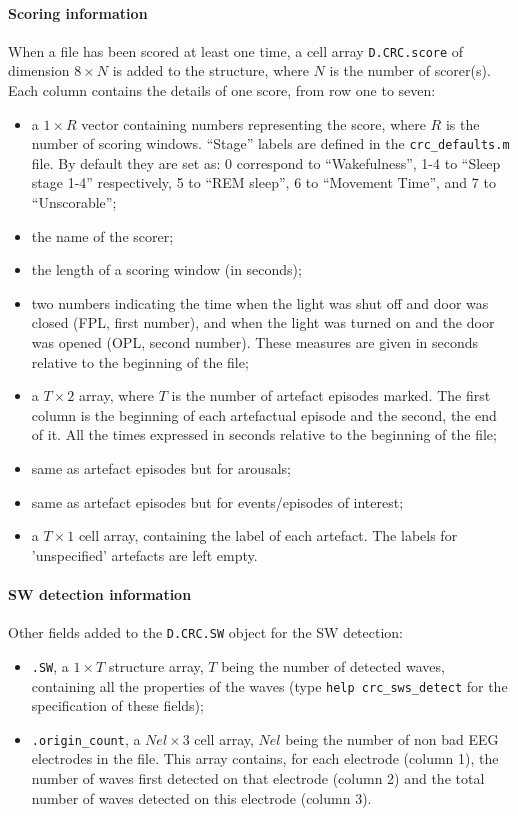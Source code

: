 \documentclass[a4paper,titlepage]{article}
\newcommand{\bi}{\begin{itemize}}
\newcommand{\ei}{\end{itemize}}
\begin{document}
\paragraph{Scoring information}
When a file has been scored at least one time, a cell array {\tt D.CRC.score} of dimension $8\times N$ is added to the structure, where $N$ is the number of scorer(s). Each column contains the details of one score, from row one to seven:
\bi
\item a $1\times R$ vector containing numbers representing the score, where $R$ is the number of scoring windows. ``Stage'' labels  are defined in the {\tt crc\_defaults.m} file. By default they are set as: 0 correspond to ``Wakefulness'', 1-4 to ``Sleep stage 1-4'' respectively, 5 to ``REM sleep'', 6 to ``Movement Time'', and 7 to ``Unscorable'';
\item the name of the scorer;
\item the length of a scoring window (in seconds);
\item two numbers indicating the time when the light was shut off and door was closed (FPL, first number), and when the light was turned on and the door was opened (OPL, second number). These measures are given in seconds relative to the beginning of the file;
\item a $T\times 2$ array, where $T$ is the number of artefact episodes marked. The first column is the beginning of each artefactual episode and the second, the end of it. All the times expressed in seconds relative to the beginning of the file;
\item same as artefact episodes but for arousals;
\item same as artefact episodes but for events/episodes of interest;
\item a $T\times 1$ cell array, containing the label of each artefact. The labels for 'unspecified' artefacts are left empty.
\ei

\paragraph{SW detection information}
Other fields added to the {\tt D.CRC.SW} object for the SW detection:
\bi
\item {\tt .SW}, a $1\times T$ structure array, $T$ being the number of detected waves, containing all the properties of the waves (type {\tt help crc\_sws\_detect} for the specification of these fields);
\item {\tt .origin\_count}, a $N\!el\times 3$ cell array, $N\!el$ being the number of non bad EEG electrodes in the file. This array contains, for each electrode (column 1), the number of waves first detected on that electrode (column 2) and the total number of waves detected on this electrode (column 3).
\ei
\end{document}
